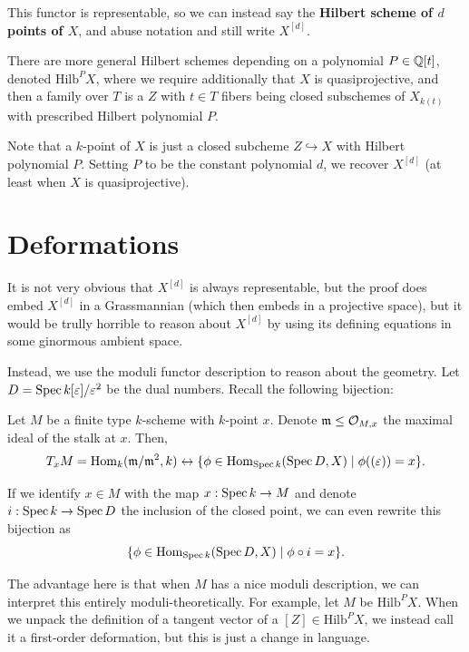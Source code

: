 \documentclass[12pt]{article}
\newcommand{\Hilb}{\mathrm{Hilb}}
\begin{document}
\begin{fact}
    This functor is representable, so we can instead say the \textbf{Hilbert scheme of $d$ points of $X$}, and abuse notation and still write $X^{[d]}$.
\end{fact}


There are more general Hilbert schemes depending on a polynomial $P\in \mathbb{Q}[t]$, denoted $\Hilb^P X$, where we require additionally that $X$ is quasiprojective, and then a family over $T$ is a $Z$ with $t\in T$ fibers being closed subschemes of $X_{k(t)}$ with prescribed Hilbert polynomial $P$.

Note that a $k$-point of $X$ is just a closed subcheme $Z\hookrightarrow X$ with Hilbert polynomial $P$. Setting $P$ to be the constant polynomial $d$, we recover $X^{[d]}$ (at least when $X$ is quasiprojective).



\section{Deformations}

It is not very obvious that $X^{[d]}$ is always representable, but the proof does embed $X^{[d]}$ in a Grassmannian (which then embeds in a projective space), but it would be trully horrible to reason about $X^{[d]}$ by using its defining equations in some ginormous ambient space.

Instead, we use the moduli functor description to reason about the geometry. Let $D=\operatorname{Spec} k[\varepsilon]/\varepsilon^2$ be the dual numbers. Recall the following bijection:

\begin{prop}
    Let $M$ be a finite type $k$-scheme with $k$-point $x$. Denote $\mathfrak{m}\leq \mathcal{O}_{M,x}$ the maximal ideal of the stalk at $x$. Then,
    \[T_x M = \Hom_k(\fm/\fm^2,k) \leftrightarrow \{\phi \in \Hom_{\Spec k}(\Spec D, X) \mid \phi((\eps))=x\}.\]
\end{prop}

If we identify $x\in M$ with the map $x: \operatorname{Spec} k \to M$ and denote $i:\operatorname{Spec} k \to \operatorname{Spec} D$ the inclusion of the closed point, we can even rewrite this bijection as
\[\{\phi \in \Hom_{\Spec k}(\Spec D, X) \mid \phi \circ i = x\}.\]

The advantage here is that when $M$ has a nice moduli description, we can interpret this entirely moduli-theoretically. For example, let $M$ be $\Hilb^P X$. When we unpack the definition of a tangent vector of a $[Z]\in \Hilb^P X$, we instead call it a first-order deformation, but this is just a change in language. 
\end{document}
